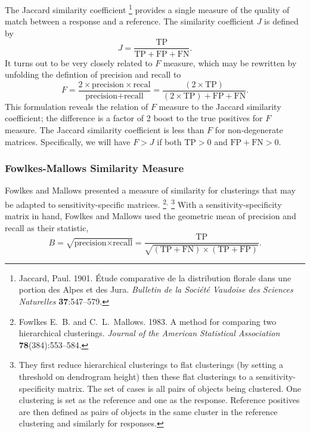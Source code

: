The Jaccard similarity coefficient%
%
\footnote{Jaccard, Paul. 1901. Étude comparative de la distribution
  florale dans une portion des Alpes et des Jura. {\it Bulletin de la
  Société Vaudoise des Sciences Naturelles} {\bf 37}:547--579.}
%
provides a single measure of the quality of match between a response
and a reference.  The similarity coefficient $J$ is defined by
%
\begin{equation}
J = \frac{\mbox{TP}}{\mbox{TP} + \mbox{FP} + \mbox{FN}}.
\end{equation}
%
It turns out to be very closely related to $F$ measure, 
which may be rewritten by unfolding the defintion of precision
and recall to
%
\begin{equation}
F = \frac{2 \times \mbox{precision} \times \mbox{recal}}
          {\mbox{precision} + \mbox{recall}}
= \frac{(2 \times \mbox{TP})}
        {(2 \times \mbox{TP}) + \mbox{FP} + \mbox{FN}}.
\end{equation}
%
This formulation reveals the relation of $F$ measure to the Jaccard
similarity coefficient; the difference is a factor of 2 boost to the
true positives for $F$ measure.  The Jaccard similarity coefficient is
less than $F$ for non-degenerate matrices.  Specifically, we will have
$F > J$ if both $\mbox{TP} > 0$ and $\mbox{FP} + \mbox{FN} > 0$.



\subsubsection{Fowlkes-Mallows Similarity Measure}

Fowlkes and Mallows presented a measure of similarity for clusterings
that may be adapted to sensitivity-specific matrices.%
%
\footnote{Fowlkes E.~B. and C.~L.~Mallows. 1983. A method for
  comparing two hierarchical clusterings. {\it Journal of the American
  Statistical Association} {\bf 78}(384):553--584. }\hspace*{-1pt}${}^{,}$%
%
\footnote{They first reduce hierarchical clusterings to flat
  clusterings (by setting a threshold on dendrogram height) then these
  flat clusterings to a sensitivity-specificity matrix.  The set of
  cases is all pairs of objects being clustered.  One clustering is
  set as the reference and one as the response.  Reference positives
  are then defined as pairs of objects in the same cluster in the
  reference clustering and similarly for responses.}
%
With a sensitivity-specificity matrix in hand, Fowlkes and Mallows
used the geometric mean of precision and recall as their statistic,
%
\begin{equation}
B 
= \sqrt{\mbox{precision} \times \mbox{recall}}
= \frac{\mbox{TP}}{\sqrt{(\mbox{TP} + \mbox{FN}) \times (\mbox{TP} + \mbox{FP})}}.
\end{equation}
%

